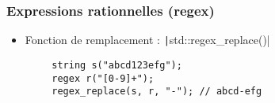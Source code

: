 \documentclass[C++.tex]{subfiles}
\begin{document}
\begin{frame}[fragile]
	\frametitle{Expressions rationnelles (regex)}
	\begin{itemize}
		\item Fonction de remplacement : \texttt|std::regex_replace()|
	\end{itemize}

	\begin{verbatim}
		string s("abcd123efg");
		regex r("[0-9]+");
		regex_replace(s, r, "-"); // abcd-efg
	\end{verbatim}

\end{frame}
\end{document}
